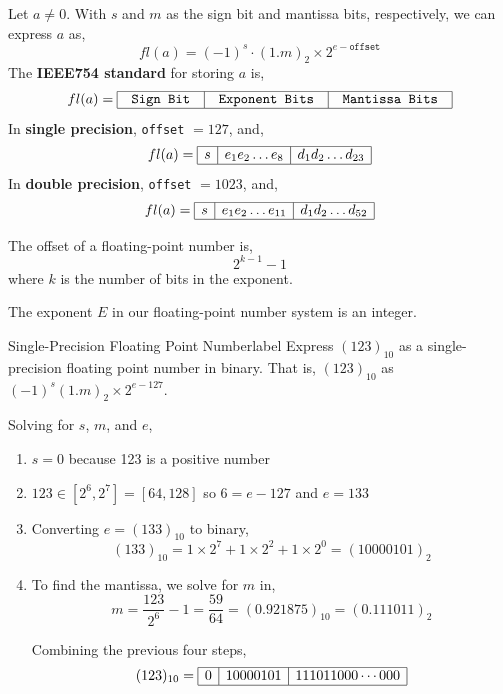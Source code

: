 \begin{defn}
    \sloppy Let $a \neq 0$. With $s$ and $m$ as the sign bit and mantissa bits, respectively, we can express $a$ as,
    \[fl(a) = (-1)^s \cdot (1 . m)_2 \times 2^{e-\texttt{offset}}\]
    The \textbf{IEEE754 standard} for storing $a$ is,
    \[fl(a)=\begin{array}{|l|l|l|}
    \hline \texttt { Sign Bit } & \texttt { Exponent Bits } & \texttt { Mantissa Bits } \\
    \hline
    \end{array}\]
    In \textbf{single precision}, \texttt{offset} $= 127$, and,
    \[fl(a)=\begin{array}{|l|l|l|}
    \hline s & e_1 e_2 \ldots e_8 & d_1 d_2 \ldots d_{23} \\
    \hline
    \end{array}\]
    In \textbf{double precision}, \texttt{offset} $= 1023$, and,
    \[f l(a)=\begin{array}{|l|l|l|}
    \hline s & e_1 e_2 \ldots e_{11} & d_1 d_2 \ldots d_{52} \\
    \hline
    \end{array}\]
\end{defn}

\begin{rmk}
    The offset of a floating-point number is,
    \[2^{k-1}-1\]
    where $k$ is the number of bits in the exponent.
\end{rmk}

\begin{marginfigure}
    The exponent $E$ in our floating-point number system is an integer.
\end{marginfigure}

\begin{ex}{Single-Precision Floating Point Number}{label}
    Express $(123)_{10}$ as a single-precision floating point number in binary. That is, $(123)_{10}$ as $(-1)^s(1 . m)_2 \times 2^{e-127}$.
    
    \LineBreak
    
    Solving for $s$, $m$, and $e$,
    \begin{enumerate}
        \item $s = 0$ because 123 is a positive number
        \item $123 \in [2^6, 2^7] = [64, 128]$ so $6 = e - 127$ and $e = 133$
        \item Converting $e = (133)_{10}$ to binary,
        \[(133)_{10}=1 \times 2^7+1 \times 2^2+1 \times 2^0=(10000101)_2\]
        \item To find the mantissa, we solve for $m$ in,
        \[m=\frac{123}{2^6}-1=\frac{59}{64}=(0.921875)_{10} = (0.111011)_2\]
    
    Combining the previous four steps,
    \[(123)_{10}=\begin{array}{|l|l|l|}
    \hline 0 & 10000101 & 111011000 \cdots 000 \\
    \hline
    \end{array}\]
    \end{enumerate}
\end{ex}

